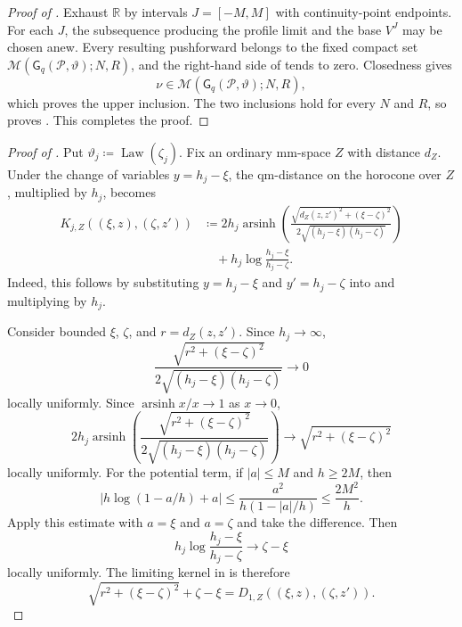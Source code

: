 \documentclass{amsart}
\numberwithin{equation}{section}
\theoremstyle{plain}
\theoremstyle{definition}
\theoremstyle{remark}
\newcommand{\R}{\mathbb R}
\DeclareMathOperator{\arsinh}{arsinh}
\begin{document}
\begin{proof}[Proof of ]
Exhaust $\R$ by intervals $J=[-M,M]$ with continuity-point endpoints.  For each $J$, the subsequence producing the profile
limit and the base $V^J$ may be chosen anew.  Every resulting pushforward belongs to the fixed compact set
$\mathcal M(\mathsf G_q(\mathcal P,\vartheta);N,R)$, and the right-hand side of
 tends to zero.  Closedness gives
\[
 \nu\in\mathcal M(\mathsf G_q(\mathcal P,\vartheta);N,R),
\]
which proves the upper inclusion.  The two inclusions hold for every $N$ and $R$, so
 proves .
This completes the proof.
\end{proof}

\begin{proof}[Proof of ]
Put $\vartheta_j\coloneqq\operatorname{Law}(\zeta_j)$.  Fix an ordinary mm-space $Z$ with distance $d_Z$.  Under the
change of variables $y=h_j-\xi$, the qm-distance on the horocone over $Z$, multiplied by $h_j$, becomes
\begin{equation}\label{eq:scaled-horocone-mark-kernel}
\begin{split}
 K_{j,Z}((\xi,z),(\zeta,z'))
 &\coloneqq 2h_j\arsinh\left(
   \frac{\sqrt{d_Z(z,z')^2+(\xi-\zeta)^2}}
        {2\sqrt{(h_j-\xi)(h_j-\zeta)}}
  \right)\\
 &\quad+h_j\log\frac{h_j-\xi}{h_j-\zeta}.
\end{split}
\end{equation}
Indeed, this follows by substituting $y=h_j-\xi$ and $y'=h_j-\zeta$ into
 and multiplying by $h_j$.

Consider bounded $\xi$, $\zeta$, and $r=d_Z(z,z')$.  Since $h_j\to\infty$,
\[
 \frac{\sqrt{r^2+(\xi-\zeta)^2}}
      {2\sqrt{(h_j-\xi)(h_j-\zeta)}}\longrightarrow0
\]
locally uniformly.  Since $\arsinh x/x\to1$ as $x\to0$,
\begin{equation}\label{eq:tangent-symmetric-kernel}
 2h_j\arsinh\left(
  \frac{\sqrt{r^2+(\xi-\zeta)^2}}
       {2\sqrt{(h_j-\xi)(h_j-\zeta)}}
 \right)
 \longrightarrow\sqrt{r^2+(\xi-\zeta)^2}
\end{equation}
locally uniformly.  For the potential term, if $|a|\le M$ and $h\ge2M$, then
\[
 \left|h\log(1-a/h)+a\right|
 \le\frac{a^2}{h(1-|a|/h)}
 \le\frac{2M^2}{h}.
\]
Apply this estimate with $a=\xi$ and $a=\zeta$ and take the difference.  Then
\begin{equation}\label{eq:tangent-potential-kernel}
 h_j\log\frac{h_j-\xi}{h_j-\zeta}
 \longrightarrow\zeta-\xi
\end{equation}
locally uniformly.  The limiting kernel in  is therefore
\[
 \sqrt{r^2+(\xi-\zeta)^2}+\zeta-\xi
 =D_{1,Z}((\xi,z),(\zeta,z')).
\]


\end{proof}
\end{document}
